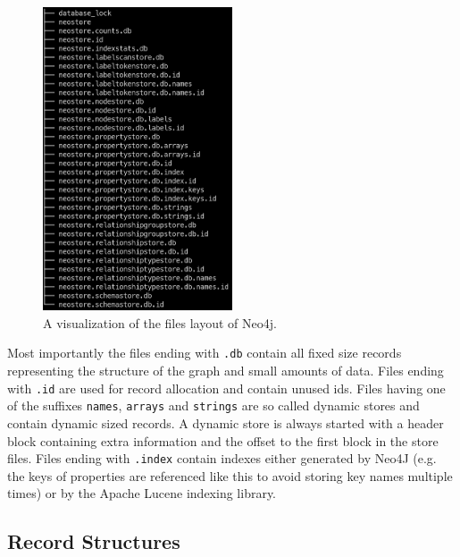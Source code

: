 \documentclass[a4paper,10pt]{article}
\begin{document}
        \begin{figure}[htp]\label{files}
            \begin{center}
                \includegraphics[keepaspectratio,height=0.4\textheight,width=0.5\textwidth]{img/03_record/files.png}
            \end{center}
            \caption{A visualization of the files layout of Neo4j.} %
        \end{figure}

        Most importantly the files ending with \texttt{.db} contain all fixed size records representing the structure of the graph and small amounts of data.
        Files ending with \texttt{.id} are used for record allocation and contain unused ids. Files having one of the suffixes \texttt{names}, \texttt{arrays} and \texttt{strings} are so called dynamic stores and contain dynamic sized records. A dynamic store is always started with a header block containing extra information and the offset to the first block in the store files. Files ending with \texttt{.index} contain indexes either generated by Neo4J (e.g. the keys of properties are referenced like this to avoid storing key names multiple times) or by the Apache Lucene indexing library.
        
    
    \subsection{Record Structures}
\end{document}
